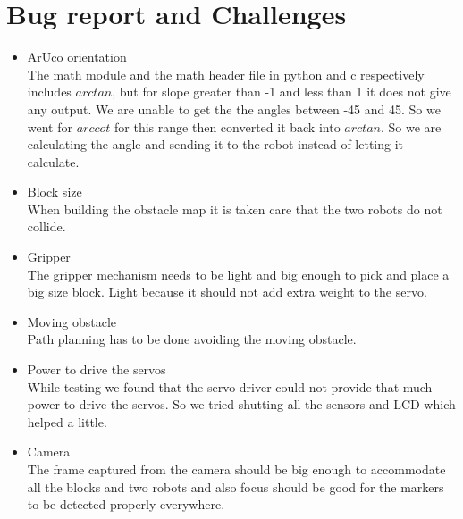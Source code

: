 \documentclass[a4paper,12pt,oneside]{book}
\begin{document}
\section{Bug report and Challenges}
\begin{itemize}
\color{red}
\item ArUco orientation\\\color{black}
The math module and the math header file in python and c respectively includes $arctan$, but for slope greater than -1 and less than 1 it does not give any output. We are unable to get the the angles between -45 and 45. So we went for $arccot$ for this range then converted it back into $arctan$. So we are calculating the angle and sending it to the robot instead of letting it calculate.
\color{red}
\item Block size\\\color{black}
When building the obstacle map it is taken care that the two robots do not collide.
\color{red}
\item Gripper\\\color{black}
The gripper mechanism needs to be light and big enough to pick and place a big size block. Light because it should not add extra weight to the servo.
\color{red}
\item Moving obstacle\\\color{black}
Path planning has to be done avoiding the moving obstacle.
\color{red}
\item Power to drive the servos\\\color{black}
While testing we found that the servo driver could not provide that much power to drive the servos. So we tried shutting all the sensors and LCD which helped a little.
\color{red}
\item Camera\\\color{black}
The frame captured from the camera should be big enough to accommodate all the blocks and two robots and also focus should be good for the markers to be detected properly everywhere. 
\end{itemize}
\end{document}
